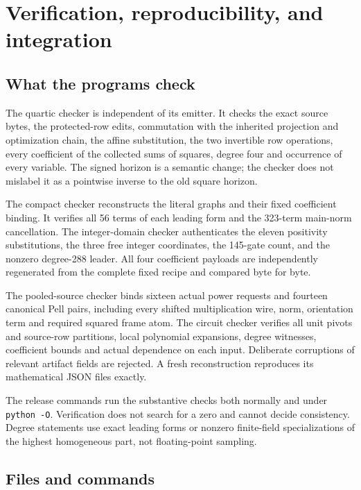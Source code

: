 \documentclass[11pt]{article}
\begin{document}
\section{Verification, reproducibility, and integration}
\label{sec:verify}

\subsection{What the programs check}

The quartic checker is independent of its emitter. It checks the exact
source bytes, the protected-row edits, commutation with the inherited
projection and optimization chain, the affine substitution, the two
invertible row operations, every coefficient of the collected sums of
squares, degree four and occurrence of every variable.
The signed horizon is a semantic change; the checker does not
mislabel it as a pointwise inverse to the old square horizon.

The compact checker reconstructs the literal graphs and their fixed
coefficient binding. It verifies all 56 terms of each leading form and
the 323-term main-norm cancellation. The integer-domain checker
authenticates the eleven positivity substitutions, the three free
integer coordinates, the 145-gate count, and the nonzero degree-288
leader. All four coefficient payloads are independently regenerated
from the complete fixed recipe and compared byte for byte.

The pooled-source checker binds sixteen actual power requests and fourteen
canonical Pell pairs, including every shifted multiplication wire,
norm, orientation term and required squared frame atom. The circuit
checker verifies all unit pivots and source-row partitions, local
polynomial expansions, degree witnesses, coefficient bounds and actual
dependence on each input. Deliberate corruptions of relevant artifact
fields are rejected. A fresh reconstruction reproduces its mathematical
JSON files exactly.

The release commands run the substantive checks both normally and under
\texttt{python -O}. Verification does not search for a zero and cannot
decide consistency. Degree statements use exact leading forms or
nonzero finite-field specializations of the highest homogeneous part,
not floating-point sampling.

\subsection{Files and commands}
\end{document}
